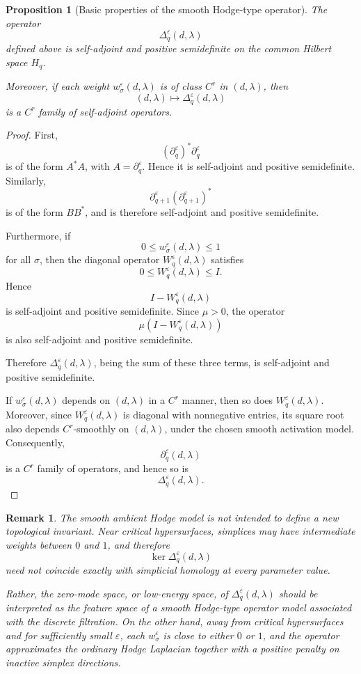 \documentclass[pdflatex,sn-mathphys-num]{sn-jnl}%
\theoremstyle{thmstyleone}%
\newtheorem{proposition}[theorem]{Proposition}%
\theoremstyle{thmstyletwo}%
\newtheorem{remark}{Remark}%
\theoremstyle{thmstylethree}%
\begin{document}
\begin{proposition}[Basic properties of the smooth Hodge-type operator]
The operator
\[
\Delta_q^\varepsilon(d,\lambda)
\]
defined above is self-adjoint and positive semidefinite on the common Hilbert
space \(H_q\).

Moreover, if each weight \(w_\sigma^\varepsilon(d,\lambda)\) is of class \(C^r\)
in \((d,\lambda)\), then
\[
(d,\lambda)\longmapsto \Delta_q^\varepsilon(d,\lambda)
\]
is a \(C^r\) family of self-adjoint operators.
\end{proposition}

\begin{proof}
First,
\[
(\partial_q^\varepsilon)^\ast\partial_q^\varepsilon
\]
is of the form \(A^\ast A\), with \(A=\partial_q^\varepsilon\). Hence it is
self-adjoint and positive semidefinite. Similarly,
\[
\partial_{q+1}^\varepsilon(\partial_{q+1}^\varepsilon)^\ast
\]
is of the form \(BB^\ast\), and is therefore self-adjoint and positive
semidefinite.

Furthermore, if
\[
0\le w_\sigma^\varepsilon(d,\lambda)\le 1
\]
for all \(\sigma\), then the diagonal operator \(W_q^\varepsilon(d,\lambda)\)
satisfies
\[
0\le W_q^\varepsilon(d,\lambda)\le I.
\]
Hence
\[
I-W_q^\varepsilon(d,\lambda)
\]
is self-adjoint and positive semidefinite. Since \(\mu>0\), the operator
\[
\mu(I-W_q^\varepsilon(d,\lambda))
\]
is also self-adjoint and positive semidefinite.

Therefore \(\Delta_q^\varepsilon(d,\lambda)\), being the sum of these three
terms, is self-adjoint and positive semidefinite.

If \(w_\sigma^\varepsilon(d,\lambda)\) depends on \((d,\lambda)\) in a \(C^r\)
manner, then so does \(W_q^\varepsilon(d,\lambda)\). Moreover, since
\(W_q^\varepsilon(d,\lambda)\) is diagonal with nonnegative entries, its square
root also depends \(C^r\)-smoothly on \((d,\lambda)\), under the chosen smooth
activation model. Consequently,
\[
\partial_q^\varepsilon(d,\lambda)
\]
is a \(C^r\) family of operators, and hence so is
\[
\Delta_q^\varepsilon(d,\lambda).
\]
\end{proof}

\begin{remark}
The smooth ambient Hodge model is not intended to define a new topological
invariant. Near critical hypersurfaces, simplices may have intermediate weights
between \(0\) and \(1\), and therefore
\[
\ker \Delta_q^\varepsilon(d,\lambda)
\]
need not coincide exactly with simplicial homology at every parameter value.

Rather, the zero-mode space, or low-energy space, of
\(\Delta_q^\varepsilon(d,\lambda)\) should be interpreted as the feature space of
a smooth Hodge-type operator model associated with the discrete filtration. On
the other hand, away from critical hypersurfaces and for sufficiently small
\(\varepsilon\), each \(w_\sigma^\varepsilon\) is close to either \(0\) or \(1\),
and the operator approximates the ordinary Hodge Laplacian together with a
positive penalty on inactive simplex directions.
\end{remark}
\end{document}
